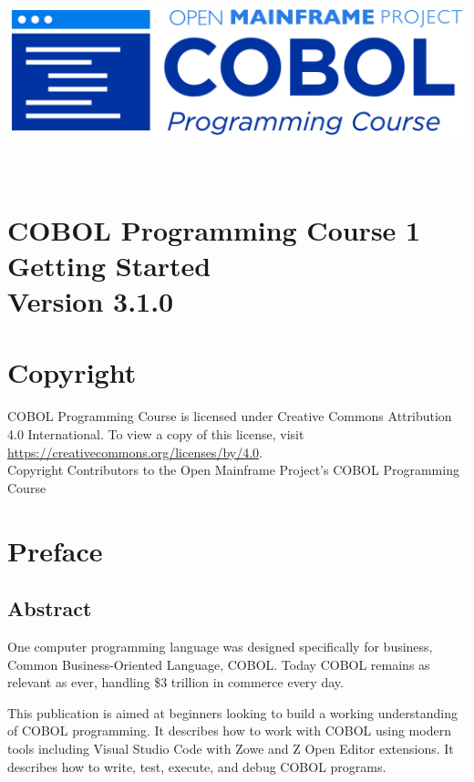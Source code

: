 \begin{center}
  \vspace*{25pt}
\includegraphics{Images/COBOL-Programming-Course.png}
\hypertarget{cobol-programming-course-1}{%
\section*{
  \\[35pt]
  \Huge COBOL Programming Course 1 \\[10pt]
  \Huge Getting Started \\[15pt]
  \Large Version 3.1.0}\label{cobol-programming-course-1}}
\end{center}

\pagebreak
\hypertarget{copyright}{%
\section*{Copyright}{
  \normalsize COBOL Programming Course is licensed under Creative Commons 
  Attribution 4.0 International. To view a copy of this license, visit 
  \href{https://creativecommons.org/licenses/by/4.0}{https://creativecommons.org/licenses/by/4.0}. \\[10pt]
  Copyright Contributors to the Open Mainframe Project's COBOL Programming Course}\label{copyright}}
\pagebreak

\hypertarget{preface}{%
\section*{Preface}\label{preface}}

\hypertarget{abstract}{%
\subsection*{Abstract}\label{abstract}}

One computer programming language was designed specifically for
business, Common Business-Oriented Language, COBOL. Today COBOL remains
as relevant as ever, handling \$3 trillion in commerce every day.

This publication is aimed at beginners looking to build a working
understanding of COBOL programming. It describes how to work with COBOL
using modern tools including Visual Studio Code with Zowe and Z Open
Editor extensions. It describes how to write, test, execute, and debug
COBOL programs.

